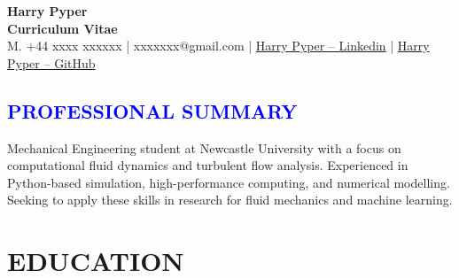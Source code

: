 \documentclass[../main.tex]{subfiles}
\begin{document}
\justifying
\pagestyle{empty}
\begin{center}
    
    \textbf{\Huge Harry Pyper }\\[3pt] %
    \textbf{Curriculum Vitae}\\[1pt] %
    M. +44 xxxx xxxxxx | {xxxxxxx@gmail.com} | \href{http://www.linkedin.com/in/xxxx-xxxxx}{{Harry Pyper -- Linkedin}} | \href{https://github.com/harrypyper}{{Harry Pyper -- GitHub}}
\end{center}

\textcolor{blue}{
\section*{PROFESSIONAL SUMMARY}
}
    \noindent
    \newline
    Mechanical Engineering student at Newcastle University with a focus on computational fluid dynamics and turbulent flow analysis. Experienced in Python-based simulation, high-performance computing, and numerical modelling. Seeking to apply these skills in research for fluid mechanics and machine learning.

\section*{EDUCATION}

    \noindent
\end{document}
